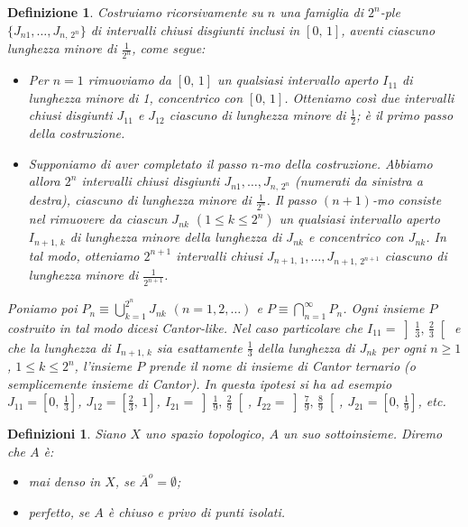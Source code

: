 \documentclass[a4paper,10pt,openright,oneside]{book}
\theoremstyle{theoremstyle}
\theoremstyle{theoremstylewoheader}
\theoremstyle{theoremstyle}
\newtheorem{definizione}[teorema]{Definizione}
\newtheorem{definizioni}[teorema]{Definizioni}
\theoremstyle{proofsecstyle}
\theoremstyle{nonumberplain}
\newcommand{\closure}[1]{\ensuremath{\overline{#1}}}
\newcommand{\interior}[1]{\ensuremath{#1^o}}
\begin{document}
\begin{definizione}
\label{def:insiemi_cantor_like}
Costruiamo ricorsivamente su $n$ una famiglia di $2^n$-ple $\{J_{n1}, \ldots, J_{n,\, 2^n}\}$ di intervalli chiusi disgiunti inclusi in $[0,\, 1]$, aventi ciascuno lunghezza minore di $\frac{1}{2^n}$, come segue:
\begin{itemize}
\item[($\alpha$)] Per $n = 1$ rimuoviamo da $[0,\, 1]$ un qualsiasi intervallo aperto $I_{11}$ di lunghezza minore di 1, concentrico con $[0,\, 1]$. Otteniamo così due intervalli chiusi disgiunti $J_{11}$ e $J_{12}$ ciascuno di lunghezza minore di $\frac{1}{2}$; è il primo passo della costruzione. 
\item[($\beta$)] Supponiamo di aver completato il passo $n$-mo della costruzione. Abbiamo allora $2^n$ intervalli chiusi disgiunti $J_{n1}, \ldots, J_{n,\, 2^n}$ (numerati da sinistra a destra), ciascuno di lunghezza minore di $\frac{1}{2^n}$. Il passo $(n+1)$-mo consiste nel rimuovere da ciascun $J_{nk}$ $(1 \le k \le 2^n)$ un qualsiasi intervallo aperto $I_{n+1,\, k}$ di lunghezza minore della lunghezza di $J_{nk}$ e concentrico con $J_{nk}$. In tal modo, otteniamo $2^{n+1}$ intervalli chiusi $J_{n+1,\, 1}, \ldots, J_{n+1,\, 2^{n+1}}$ ciascuno di lunghezza minore di $\frac{1}{2^{n+1}}$.
\end{itemize}
Poniamo poi $P_n \equiv \bigcup_{k=1}^{2^n} J_{nk}$ $(n = 1, 2, \ldots)$ e $P \equiv \bigcap_{n=1}^\infty P_n$. Ogni insieme $P$ costruito in tal modo dicesi \emph{Cantor-like}. Nel caso particolare che $I_{11} = \left]\frac{1}{3},\, \frac{2}{3}\right[$ e che la lunghezza di $I_{n+1,\, k}$ sia esattamente $\frac{1}{3}$ della lunghezza di $J_{nk}$ per ogni $n \ge 1$, $1 \le k \le 2^n$, l'insieme $P$ prende il nome di \emph{insieme di Cantor ternario} (o semplicemente \emph{insieme di Cantor}). In questa ipotesi si ha ad esempio $J_{11} = \left[0,\, \frac{1}{3}\right]$, $J_{12} = \left[\frac{2}{3},\, 1\right]$, $I_{21} = \left]\frac{1}{9},\, \frac{2}{9}\right[$, $I_{22} = \left]\frac{7}{9},\, \frac{8}{9}\right[$, $J_{21} = \left[0,\, \frac{1}{9}\right]$, etc. 
\end{definizione}

\begin{definizioni}
Siano $X$ uno spazio topologico, $A$ un suo sottoinsieme. Diremo che $A$ è:
\begin{itemize}
\item[(i)] \emph{mai denso} in $X$, se $\interior{\closure{A}} = \emptyset$;
\item[(ii)] \emph{perfetto}, se $A$ è chiuso e privo di punti isolati.
\end{itemize}
\end{definizioni}
\end{document}
